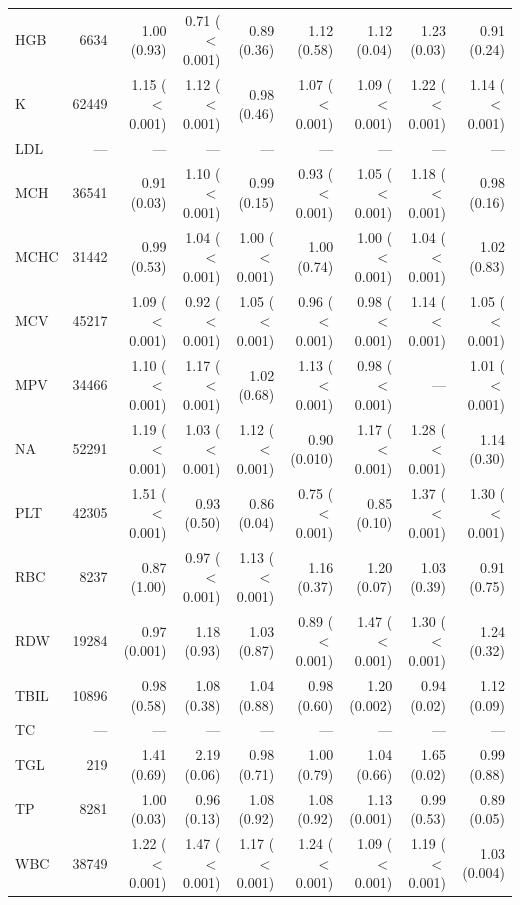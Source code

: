 \begin{table}[ht]
\begin{tabular}{lrrrrrrrr}
HGB & 6634 & 1.00 (0.93) & 0.71 ($<$0.001) & 0.89 (0.36) & 1.12 (0.58) & 1.12 (0.04) & 1.23 (0.03) & 0.91 (0.24) \\
K & 62449 & 1.15 ($<$0.001) & 1.12 ($<$0.001) & 0.98 (0.46) & 1.07 ($<$0.001) & 1.09 ($<$0.001) & 1.22 ($<$0.001) & 1.14 ($<$0.001) \\
LDL & --- & --- & --- & --- & --- & --- & --- & --- \\
MCH & 36541 & 0.91 (0.03) & 1.10 ($<$0.001) & 0.99 (0.15) & 0.93 ($<$0.001) & 1.05 ($<$0.001) & 1.18 ($<$0.001) & 0.98 (0.16) \\
MCHC & 31442 & 0.99 (0.53) & 1.04 ($<$0.001) & 1.00 ($<$0.001) & 1.00 (0.74) & 1.00 ($<$0.001) & 1.04 ($<$0.001) & 1.02 (0.83) \\
MCV & 45217 & 1.09 ($<$0.001) & 0.92 ($<$0.001) & 1.05 ($<$0.001) & 0.96 ($<$0.001) & 0.98 ($<$0.001) & 1.14 ($<$0.001) & 1.05 ($<$0.001) \\
MPV & 34466 & 1.10 ($<$0.001) & 1.17 ($<$0.001) & 1.02 (0.68) & 1.13 ($<$0.001) & 0.98 ($<$0.001) & --- & 1.01 ($<$0.001) \\
NA & 52291 & 1.19 ($<$0.001) & 1.03 ($<$0.001) & 1.12 ($<$0.001) & 0.90 (0.010) & 1.17 ($<$0.001) & 1.28 ($<$0.001) & 1.14 (0.30) \\
PLT & 42305 & 1.51 ($<$0.001) & 0.93 (0.50) & 0.86 (0.04) & 0.75 ($<$0.001) & 0.85 (0.10) & 1.37 ($<$0.001) & 1.30 ($<$0.001) \\
RBC & 8237 & 0.87 (1.00) & 0.97 ($<$0.001) & 1.13 ($<$0.001) & 1.16 (0.37) & 1.20 (0.07) & 1.03 (0.39) & 0.91 (0.75) \\
RDW & 19284 & 0.97 (0.001) & 1.18 (0.93) & 1.03 (0.87) & 0.89 ($<$0.001) & 1.47 ($<$0.001) & 1.30 ($<$0.001) & 1.24 (0.32) \\
TBIL & 10896 & 0.98 (0.58) & 1.08 (0.38) & 1.04 (0.88) & 0.98 (0.60) & 1.20 (0.002) & 0.94 (0.02) & 1.12 (0.09) \\
TC & --- & --- & --- & --- & --- & --- & --- & --- \\
TGL & 219 & 1.41 (0.69) & 2.19 (0.06) & 0.98 (0.71) & 1.00 (0.79) & 1.04 (0.66) & 1.65 (0.02) & 0.99 (0.88) \\
TP & 8281 & 1.00 (0.03) & 0.96 (0.13) & 1.08 (0.92) & 1.08 (0.92) & 1.13 (0.001) & 0.99 (0.53) & 0.89 (0.05) \\
WBC & 38749 & 1.22 ($<$0.001) & 1.47 ($<$0.001) & 1.17 ($<$0.001) & 1.24 ($<$0.001) & 1.09 ($<$0.001) & 1.19 ($<$0.001) & 1.03 (0.004) \\
\bottomrule
\end{tabular}
\label{tab:17_incidence_eicu_mortality}
\end{table}